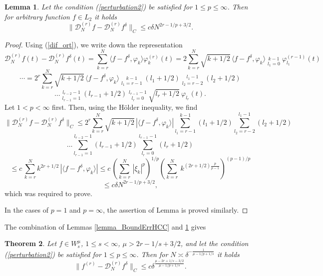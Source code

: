 \documentclass[10pt]{extarticle}
\newtheorem{theorem}{Theorem}[section]
\newtheorem{lemma}[theorem]{Lemma}
\begin{document}
\begin{lemma}\label{lemma_BoundPertHCC}
	Let the condition (\ref{perturbation2}) be satisfied for $1\le p\le \infty$. Then for arbitrary function $f\in L_2$ it holds
	$$
	\|\mathcal{D}^{(r)}_N f - \mathcal{D}^{(r)}_N f^\delta\|_C \leq c\delta N^{2r-1/p+3/2}.
	$$
\end{lemma}

\begin{proof}
Using (\ref{dif_ort}), we write down the representation
$$
\mathcal{D}^{(r)}_N f(t) - \mathcal{D}^{(r)}_N f^\delta(t)
= \sum_{k=r}^N  \langle f-f^\delta, \varphi_{k} \rangle \varphi_{k}^{(r)}(t)
= 2 \sum_{k=r}^N \sqrt{k+1/2}\, \langle f-f^\delta, \varphi_{k} \rangle
\mathop{{\sum}^*}\limits_{l_1=0}^{k-1} \varphi_{l_1}^{(r-1)}(t)
$$
$$
	  \cdots =2^r \sum_{k=r}^N \sqrt{k+1/2}\, \langle f-f^\delta, \varphi_{k} \rangle
	\mathop{{\sum}^*}\limits_{l_1=r-1}^{k-1} (l_1+1/2) \mathop{{\sum}^*}\limits_{l_2=r-2}^{l_1-1} (l_2+1/2)
$$
\begin{equation}  \label{second_dif}
    \ldots
	\mathop{{\sum}^*}\limits_{l_{r-1}=1}^{l_{r-2}-1} (l_{r-1}+1/2)
	\mathop{{\sum}^*}\limits_{l_r=0}^{l_{r-1}-1} \sqrt{l_r+1/2} \ \varphi_{l_r}(t) .
\end{equation}
Let $1< p<\infty$ first. Then, using the H\"{o}lder inequality, we find
$$
\|\mathcal{D}^{(r)}_N f - \mathcal{D}^{(r)}_N f^\delta\|_{C}
\leq 2^r \sum_{k=r}^N \sqrt{k+1/2}\, |\langle f-f^\delta, \varphi_{k} \rangle |
\mathop{{\sum}}\limits_{l_1=r-1}^{k-1} (l_1+1/2) \mathop{{\sum}}\limits_{l_2=r-2}^{l_1-1} (l_2+1/2)
$$
$$
\ldots \mathop{{\sum}}\limits_{l_{r-1}=1}^{l_{r-2}-1} (l_{r-1}+1/2)\mathop{{\sum}}\limits_{l_r=0}^{l_{r-1}-1} (l_r+1/2)
$$
$$
\leq c\, \sum_{k=r}^N k^{2r+1/2}\, |\langle f-f^\delta, \varphi_{k} \rangle |
\leq c\, \left(\sum_{k=r}^{N}\,|\xi_k|^p\right)^{1/p}
\left(\sum_{k=r}^{N}\ k^{(2r+1/2)\frac{p}{p-1}}\right)^{(p-1)/p}
$$
$$
\leq c \delta N^{2r-1/p+3/2} ,
$$
which was required to prove.

In the cases of $p=1$ and $p=\infty$, the assertion of Lemma is proved similarly. \vspace{0.1in}
\end{proof}

The combination of Lemmas \ref{lemma_BoundErrHCC} and \ref{lemma_BoundPertHCC} gives

\begin{theorem} \label{Th2}
	Let $f\in W^\mu_{s}$, $1\leq s< \infty$, $\mu>2r-1/s+3/2$, and let the condition (\ref{perturbation2}) be satisfied for $1\le p\le \infty$. Then for $N\asymp \delta^{-\frac{1}{\mu-1/p+1/s}}$ it holds
	$$
	\|f^{(r)}-\mathcal{D}^{(r)}_N f^\delta\|_C \leq c \delta^{\frac{\mu-2r+1/s-3/2}{\mu-1/p+1/s}}.
	$$
\end{theorem}
\end{document}
